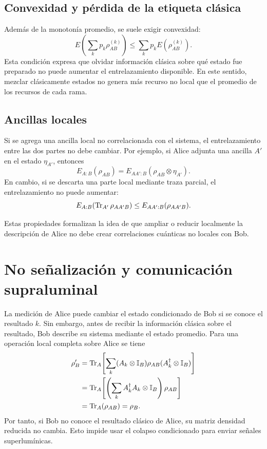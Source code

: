 \documentclass[../main.tex]{subfiles}
\begin{document}
\subsection{Convexidad y pérdida de la etiqueta clásica}

Además de la monotonía promedio, se suele exigir convexidad:
\begin{equation}
    E\!\left(\sum_k p_k\rho_{AB}^{(k)}\right)
    \leq
    \sum_k p_k E\!\left(\rho_{AB}^{(k)}\right).
    \label{eq:convexidad-entrelazamiento}
\end{equation}
Esta condición expresa que olvidar información clásica sobre qué estado fue preparado no puede aumentar el entrelazamiento disponible. En este sentido, mezclar clásicamente estados no genera más recurso no local que el promedio de los recursos de cada rama.

\subsection{Ancillas locales}

Si se agrega una ancilla local no correlacionada con el sistema, el entrelazamiento entre las dos partes no debe cambiar. Por ejemplo, si Alice adjunta una ancilla \(A'\) en el estado \(\eta_{A'}\), entonces
\begin{equation}
    E_{A:B}(\rho_{AB})
    =
    E_{AA':B}(\rho_{AB}\otimes\eta_{A'}).
    \label{eq:ancilla-local-no-cambia}
\end{equation}
En cambio, si se descarta una parte local mediante traza parcial, el entrelazamiento no puede aumentar:
\begin{equation}
    E_{A:B}\!\left(\Tr_{A'}\rho_{AA'B}\right)
    \leq
    E_{AA':B}(\rho_{AA'B}).
    \label{eq:traza-parcial-no-aumenta}
\end{equation}

Estas propiedades formalizan la idea de que ampliar o reducir localmente la descripción de Alice no debe crear correlaciones cuánticas no locales con Bob.

\section{No señalización y comunicación supraluminal}

La medición de Alice puede cambiar el estado condicionado de Bob si se conoce el resultado \(k\). Sin embargo, antes de recibir la información clásica sobre el resultado, Bob describe su sistema mediante el estado promedio. Para una operación local completa sobre Alice se tiene
\begin{align*}
    \rho_B'
    &=\Tr_A\!\left[\sum_k (A_k\otimes\mathbb{I}_B)\rho_{AB}(A_k^\dagger\otimes\mathbb{I}_B)\right] \\
    &=\Tr_A\!\left[\left(\sum_k A_k^\dagger A_k\otimes\mathbb{I}_B\right)\rho_{AB}\right] \\
    &=\Tr_A(\rho_{AB})
    =\rho_B.
\end{align*}
Por tanto, si Bob no conoce el resultado clásico de Alice, su matriz densidad reducida no cambia. Esto impide usar el colapso condicionado para enviar señales superlumínicas.
\end{document}
